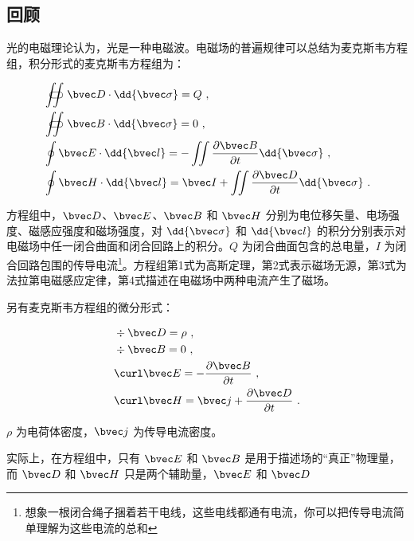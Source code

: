 

\subsection{回顾}

光的电磁理论认为，光是一种电磁波。电磁场的普遍规律可以总结为麦克斯韦方程组，积分形式的麦克斯韦方程组为：

\begin{equation}
\begin{aligned}
& \displaystyle \iint\!\!\!\!\!\!\!\!\!\!\subset\!\supset \bvec D \cdot \dd{\bvec \sigma} = Q ~, \\
& \displaystyle \iint\!\!\!\!\!\!\!\!\!\!\subset\!\supset \bvec B \cdot \dd{\bvec \sigma} = 0 ~, \\
& \oint \bvec E \cdot \dd{\bvec l} = - \iint \frac{\partial \bvec B}{\partial t} \dd{\bvec \sigma} ~, \\
& \oint \bvec H \cdot \dd{\bvec l} = \bvec I + \iint \frac{\partial \bvec D}{\partial t} \dd{\bvec \sigma} ~.
\end{aligned}
\end{equation}

方程组中，$\bvec D$、$\bvec E$、$\bvec B$ 和 $\bvec H$ 分别为电位移矢量、电场强度、磁感应强度和磁场强度，对 $\dd{\bvec \sigma}$ 和 $\dd{\bvec l}$ 的积分分别表示对电磁场中任一闭合曲面和闭合回路上的积分。$Q$ 为闭合曲面包含的总电量，$I$ 为闭合回路包围的传导电流\footnote{想象一根闭合绳子捆着若干电线，这些电线都通有电流，你可以把传导电流简单理解为这些电流的总和}。方程组第1式为高斯定理，第2式表示磁场无源，第3式为法拉第电磁感应定律，第4式描述在电磁场中两种电流产生了磁场。

另有麦克斯韦方程组的微分形式：

\begin{equation}
\begin{aligned}
& \div \bvec D = \rho ~, \\
& \div \bvec B = 0 ~, \\
& \curl \bvec E = -\frac{\partial \bvec B}{\partial t} ~, \\
& \curl \bvec H = \bvec j + \frac{\partial \bvec D}{\partial t} ~.
\end{aligned}
\end{equation}

$\rho$ 为电荷体密度，$\bvec j$ 为传导电流密度。

实际上，在方程组中，只有 $\bvec E$ 和 $\bvec B$ 是用于描述场的“真正”物理量，而 $\bvec D$ 和 $\bvec H$ 只是两个辅助量，$\bvec E$ 和 $\bvec D$ 
